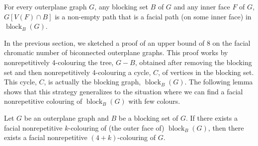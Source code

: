 \documentclass{cccg16}
\DeclareMathOperator{\block}{block}
\begin{document}
\begin{obs}
  For every outerplane graph $G$, any blocking set $B$ of $G$ and any
  inner face $F$ of $G$, $G[V(F)\cap B]$ is a non-empty path that is a
  facial path (on some inner face)  in $\block_B(G)$.
\end{obs}

In the previous section, we sketched a proof of an upper bound of 8 on
the facial chromatic number of biconnected outerplane graphs.  This proof
works by nonrepetitively 4-colouring the tree, $G-B$, obtained after
removing the blocking set and then nonrepetitively 4-colouring a cycle,
$C$, of vertices in the blocking set.  This cycle, $C$, is actually
the blocking graph, $\block_B(G)$.  The following lemma shows that
this strategy generalizes to the situation where we can find a facial
nonrepetitive colouring of $\block_B(G)$ with few colours.

\begin{lem}
  Let $G$ be an outerplane graph and $B$ be a blocking set of $G$. If
  there exists a facial nonrepetitive $k$-colouring of (the outer 
  face of) $\block_{B}(G)$, then there exists a facial nonrepetitive
  $(4+k)$-colouring of $G$.
\end{lem}
\end{document}
